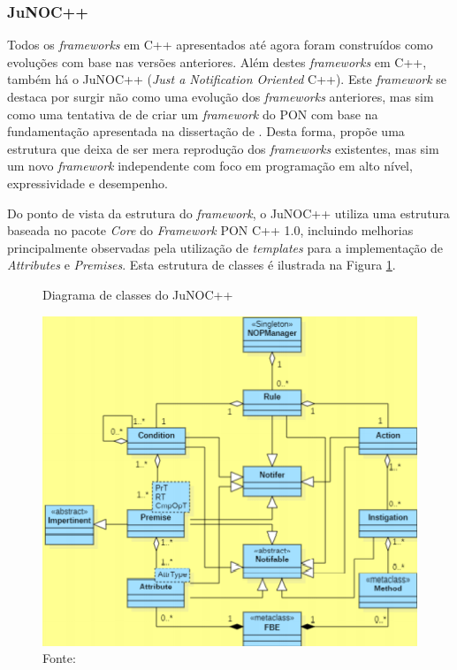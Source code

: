 \subsubsection{JuNOC++}

Todos os \textit{frameworks} em C++ apresentados até agora foram construídos
como evoluções com base nas versões anteriores. Além destes \textit{frameworks}
em C++, também há o JuNOC++ (\textit{Just a Notification Oriented} C++). Este
\textit{framework} se destaca por surgir não como uma evolução dos
\textit{frameworks} anteriores, mas sim como uma tentativa de
 de criar um \textit{framework} do PON com base na
fundamentação apresentada na dissertação de .
Desta forma,  propõe uma estrutura que deixa de ser
mera reprodução dos \textit{frameworks} existentes, mas sim um novo
\textit{framework} independente com foco em programação em alto nível,
expressividade e desempenho.

Do ponto de vista da estrutura do \textit{framework}, o JuNOC++ utiliza uma
estrutura baseada no pacote \textit{Core} do \textit{Framework} PON C++ 1.0,
incluindo melhorias principalmente observadas pela utilização de
\textit{templates} para a implementação de \textit{Attributes} e
\textit{Premises}. Esta estrutura de classes é ilustrada na Figura
\ref{fig:class_junoc}.

\begin{figure}[!htb]
  \centering
  \caption{Diagrama de classes do JuNOC++}
  \includegraphics[width=.7\textwidth]{../figures/junoc_class.png}
  \caption*{Fonte: }
  \label{fig:class_junoc}
\end{figure}

